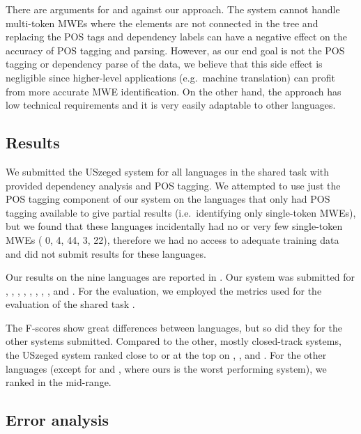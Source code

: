 \documentclass[output=paper,modfonts]{langscibook}
\begin{document}
There are arguments for and against our approach. The system cannot handle multi-token MWEs where the elements are not connected in the tree and replacing the POS tags and dependency labels can have a negative effect on the accuracy of POS tagging and parsing. However, as our end goal is not the POS tagging or dependency parse of the data, we believe that this side effect is negligible since higher-level applications (e.g.~machine translation) can profit from more accurate MWE identification. On the other hand, the approach has low technical requirements and it is very easily adaptable to other languages.


\subsection{Results}

We submitted the USzeged system for all languages in the shared task with provided dependency analysis and POS tagging. We attempted to use just the POS tagging component of our system on the languages that only had POS tagging available to give partial results (i.e.~identifying only single-token MWEs), but we found that these languages incidentally had no or very few single-token MWEs ( 0,  4,  44,  3,  22), therefore we had no access to adequate training data and did not submit results for these languages.

Our results on the nine languages are reported in \cite{Simko2017}. Our system was submitted for , , , , , , , , and . For the evaluation, we employed the metrics used for the evaluation of the shared task \citep{MWEWorkshop}.


The F-scores show great differences between languages, but so did they for the other systems submitted.
Compared to the other, mostly closed-track systems, the USzeged system ranked close to or at the top on , , and . For the other languages (except for  and , where ours is the worst performing system), we ranked in the mid-range. 

\subsection{Error analysis}
\end{document}
